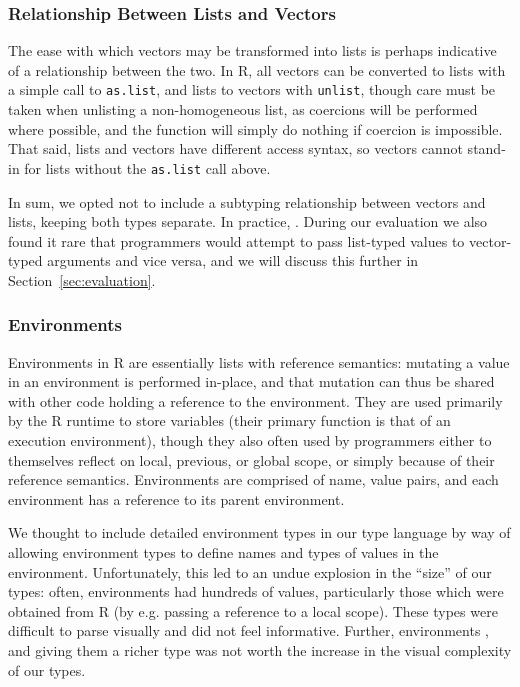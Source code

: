 \documentclass[acmsmall,review,anonymous]{acmart}\settopmatter{printfolios=true,printccs=false,printacmref=false}
\newcommand{\code}[1]{{\lstinline[style=Rin]!#1!}\xspace}
\begin{document}
%
%
\subsubsection{Relationship Between Lists and Vectors}

The ease with which vectors may be transformed into lists is perhaps
indicative of a relationship between the two.  In R, all vectors can be
converted to lists with a simple call to \code{as.list}, and lists to
vectors with \code{unlist}, though care must be taken when unlisting a
non-homogeneous list, as coercions will be performed where possible, and the
function will simply do nothing if coercion is impossible.  That said, lists
and vectors have different access syntax, so vectors cannot stand-in for
lists without the \code{as.list} call above.

In sum, we opted not to include a subtyping relationship between vectors and
lists, keeping both types separate.  In practice, \AT{how often do \code{T[]
    | list<T>} types occur?}.  During our evaluation we also found it rare
that programmers would attempt to pass list-typed values to vector-typed
arguments and vice versa, and we will discuss this further in
Section~\ref{sec:evaluation}.

%
%
\subsubsection{Environments}

Environments in R are essentially lists with reference semantics: mutating a
value in an environment is performed in-place, and that mutation can thus be
shared with other code holding a reference to the environment.  They are
used primarily by the R runtime to store variables (their primary function
is that of an execution environment), though they also often used by
programmers either to themselves reflect on local, previous, or global
scope, or simply because of their reference semantics.  Environments are
comprised of name, value pairs, and each environment has a reference to its
parent environment.

We thought to include detailed environment types in our type language by way
of allowing environment types to define names and types of values in the
environment.  Unfortunately, this led to an undue explosion in the ``size''
of our types: often, environments had hundreds of values, particularly those
which were obtained from R (by e.g. passing a reference to a local scope).
These types were difficult to parse visually and did not feel informative.
Further, environments , and giving them a richer
type was not worth the increase in the visual complexity of our types.
\end{document}

